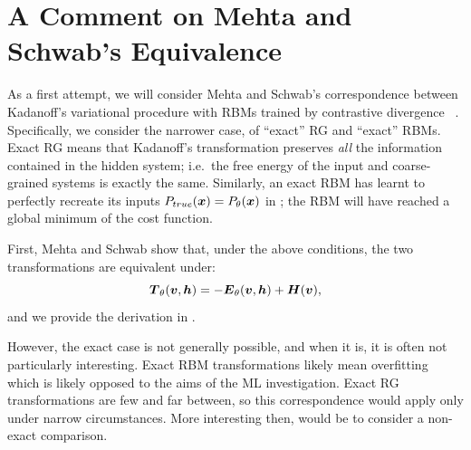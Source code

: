\section{A Comment on Mehta and Schwab's Equivalence}
As a first attempt, we will consider Mehta and Schwab's correspondence
between Kadanoff's variational procedure  with RBMs
trained by contrastive divergence
~\cite{mehta}. Specifically, we
consider the narrower case, of ``exact'' RG and ``exact'' RBMs. Exact
RG means that Kadanoff's transformation preserves \textit{all} the
information contained in the hidden system; i.e.\ the free energy of
the input and coarse-grained systems is exactly the same. Similarly,
an exact RBM has learnt to perfectly recreate its inputs
$P_{true}(\boldsymbol{x})=P_\theta(\boldsymbol{x})$ in ; the RBM will have
reached a global minimum of the cost function.

First, Mehta and Schwab show that, under the above conditions, the two
transformations are equivalent under:%
\begin{equation}
  \boldsymbol{T}_\theta(\boldsymbol{v}, \boldsymbol{h})=-\boldsymbol{E}_\theta(\boldsymbol{v},\boldsymbol{h})+\boldsymbol{H}(\boldsymbol{v}),
\end{equation}
and we provide the derivation in .

However, the exact case is not generally possible, and when it is, it
is often not particularly interesting. Exact RBM transformations
likely mean overfitting which is likely opposed to the aims of the ML
investigation. Exact RG transformations are few and far between, so
this correspondence would apply only under narrow circumstances. More
interesting then, would be to consider a non-exact comparison.

